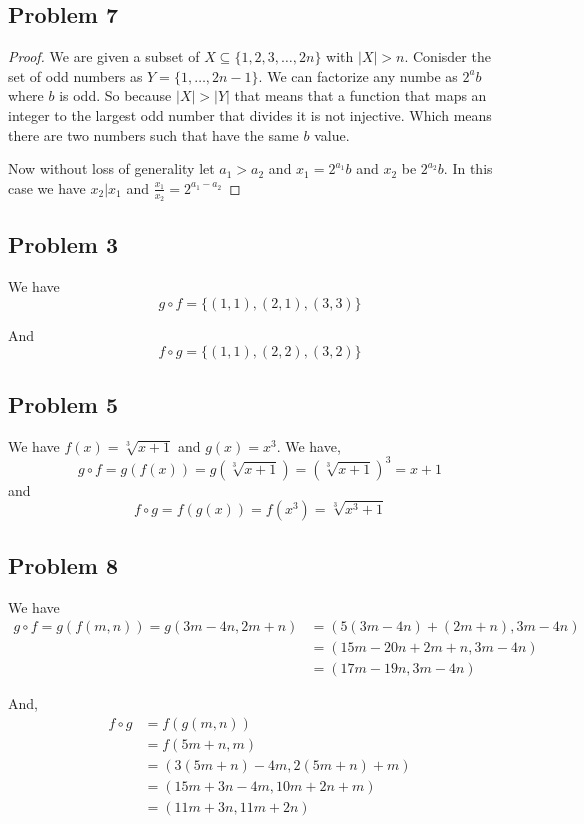 \documentclass[a4paper]{report}
\begin{document}
\subsection*{Problem 7}
\begin{proof}
    We are given a subset of $X \subseteq \{1,2,3,\dots, 2n\}$ with  $|X| > n$. Conisder the set of odd numbers as $Y = \{1,\dots,2n - 1\}$. We can factorize any numbe as  $2^{a}b$ where $b$ is odd. So because $|X| > |Y|$ that means that a function that maps an integer to the largest odd number that divides it is not injective. Which means there are two numbers such that  have the same $b$ value. 

    Now without loss of generality let $a_1 > a_2$ and $x_1 =2^{a_1}b$ and $x_2$ be $2^{a_2}b$. In this case we have $x_2 | x_1$ and $\frac{x_1}{x_2} = 2^{a_1 - a_2}$
\end{proof}


\subsection*{Problem 3}
We have $$g \circ f = \{(1,1),(2,1),(3,3)\}$$

And $$f \circ g = \{(1,1),(2,2),(3,2)\}$$

    
\subsection*{Problem 5}
We have $f(x) = \sqrt[3]{x + 1}$ and $g(x) = x^{3}$. We have, 
$$ g \circ f = g(f(x)) = g(\sqrt[3]{x + 1}) = (\sqrt[3]{x + 1})^{3} = x + 1 $$  and 
$$ f \circ g = f(g(x)) = f(x^{3})= \sqrt[3]{x^{3} + 1} $$ 


\subsection*{Problem 8}
We have 
\begin{align*}
    g \circ f = g(f(m,n)) = g(3m - 4n,2m + n) &= (5(3m - 4n) + (2m + n), 3m - 4n)\\
                                              &= (15m - 20n + 2m + n, 3m - 4n)\\
                                              &= (17m - 19n, 3m - 4n)
\end{align*}

And, 
\begin{align*}
    f \circ g &= f(g(m,n))\\
              &= f(5m + n, m)\\
              &= (3(5m + n) - 4m, 2(5m + n) + m)\\
              &= (15m + 3n - 4m, 10m + 2n + m)\\
              &= (11m + 3n, 11m + 2n)
\end{align*}
\end{document}
